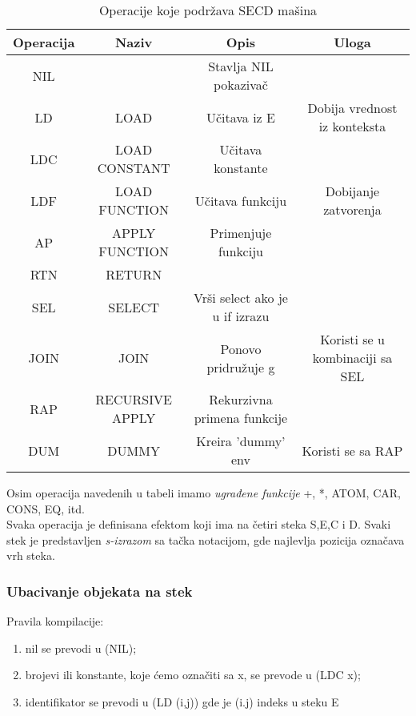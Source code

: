 \begin{table}[h!]
\begin{center}
\caption{Operacije koje podržava SECD mašina}
\begin{tabular}{|c|c|c|c|} \hline
Operacija&Naziv&Opis& Uloga\\ \hline
NIL & & Stavlja NIL pokazivač&\\ \hline
LD & LOAD & Učitava iz E & Dobija vrednost iz konteksta\\ \hline
LDC & LOAD CONSTANT & Učitava konstante&\\ \hline
LDF & LOAD FUNCTION & Učitava funkciju & Dobijanje zatvorenja\\ \hline
AP & APPLY FUNCTION & Primenjuje funkciju&\\ \hline
RTN & RETURN & & \\ \hline
SEL & SELECT & Vrši select ako je u if izrazu&\\ \hline
JOIN & JOIN & Ponovo pridružuje g& Koristi se u kombinaciji sa SEL\\ \hline
RAP & RECURSIVE APPLY & Rekurzivna primena funkcije&\\ \hline
DUM & DUMMY & Kreira 'dummy' env & Koristi se sa RAP\\ \hline
\end{tabular}
\label{tab:tabelaInstr}
\end{center}
\end{table}
Osim operacija navedenih u tabeli imamo {\em ugrađene funkcije} +,
*, ATOM, CAR, CONS, EQ, itd.\\
Svaka operacija je definisana efektom koji ima na četiri steka S,E,C i D. Svaki stek je predstavljen {\em s-izrazom} sa tačka notacijom, gde najlevlja pozicija označava vrh steka.\\

\subsubsection{Ubacivanje objekata na stek}

Pravila kompilacije:
\begin{enumerate}
\item nil se prevodi u (NIL);
\item brojevi ili konstante, koje ćemo označiti sa x, se prevode u (LDC x);
\item identifikator se prevodi u (LD (i,j)) gde je (i.j) indeks u steku E
\end{enumerate}

